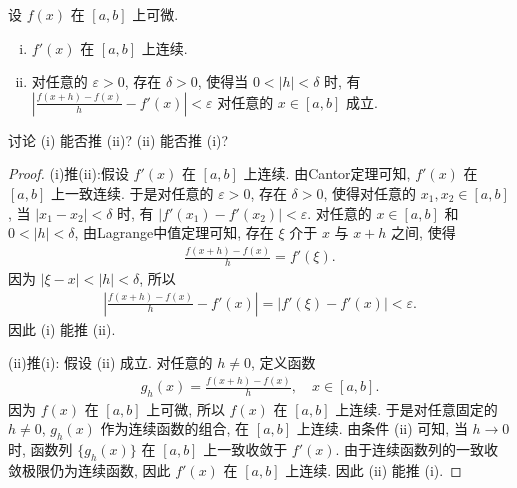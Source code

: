 \documentclass[../../main.tex]{subfiles}%
\begin{document}
\begin{example}
设 $f(x)$ 在 $[a, b]$ 上可微.
\begin{enumerate}[(i)]
\item $f'(x)$ 在 $[a, b]$ 上连续.
\item 对任意的 $\varepsilon > 0$, 存在 $\delta > 0$, 使得当 $0 < |h| < \delta$ 时, 有 $\left| \frac{f(x+h) - f(x)}{h} - f'(x) \right| < \varepsilon$ 对任意的 $x \in [a, b]$ 成立.
\end{enumerate}
讨论 (i) 能否推 (ii)? (ii) 能否推 (i)?
\end{example}
\begin{proof}

(i)推(ii):假设 $f'(x)$ 在 $[a, b]$ 上连续. 由Cantor定理可知, $f'(x)$ 在 $[a, b]$ 上一致连续. 于是对任意的 $\varepsilon > 0$, 存在 $\delta > 0$, 使得对任意的 $x_1, x_2 \in [a, b]$, 当 $|x_1 - x_2| < \delta$ 时, 有 $|f'(x_1) - f'(x_2)| < \varepsilon$.
对任意的 $x \in [a, b]$ 和 $0 < |h| < \delta$, 由Lagrange中值定理可知, 存在 $\xi$ 介于 $x$ 与 $x+h$ 之间, 使得
\begin{align*}
\frac{f(x+h) - f(x)}{h} = f'(\xi).
\end{align*}
因为 $|\xi - x| < |h| < \delta$, 所以
\begin{align*}
\left| \frac{f(x+h) - f(x)}{h} - f'(x) \right| = |f'(\xi) - f'(x)| < \varepsilon.
\end{align*}
因此 (i) 能推 (ii).

(ii)推(i): 假设 (ii) 成立. 对任意的 $h \neq 0$, 定义函数
\begin{align*}
g_h(x) = \frac{f(x+h) - f(x)}{h}, \quad x \in [a, b].
\end{align*}
因为 $f(x)$ 在 $[a, b]$ 上可微, 所以 $f(x)$ 在 $[a, b]$ 上连续. 于是对任意固定的 $h \neq 0$, $g_h(x)$ 作为连续函数的组合, 在 $[a, b]$ 上连续.
由条件 (ii) 可知, 当 $h \to 0$ 时, 函数列 $\{g_h(x)\}$ 在 $[a, b]$ 上一致收敛于 $f'(x)$.
由于连续函数列的一致收敛极限仍为连续函数, 因此 $f'(x)$ 在 $[a, b]$ 上连续.
因此 (ii) 能推 (i).
\end{proof}
\end{document}
